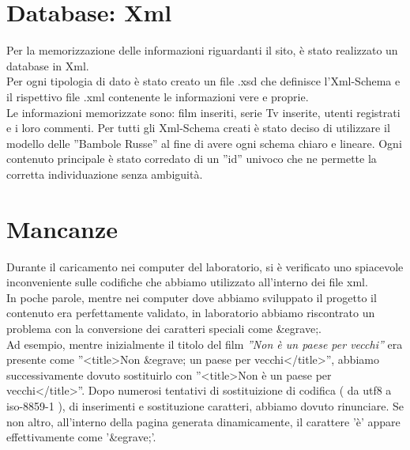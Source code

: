 \section{Database: Xml}
Per la memorizzazione delle informazioni riguardanti il sito, è stato realizzato un database in Xml.\\
Per ogni tipologia di dato è stato creato un file .xsd che definisce l'Xml-Schema e il rispettivo file .xml contenente le informazioni vere e proprie.\\
Le informazioni memorizzate sono: film inseriti, serie Tv inserite, utenti registrati e i loro commenti.
Per tutti gli Xml-Schema creati è stato deciso di utilizzare il modello delle ''Bambole Russe'' al fine di avere ogni schema chiaro e lineare.
Ogni contenuto principale è stato corredato di un ''id'' univoco che ne permette la corretta individuazione senza ambiguità.










\section{Mancanze}
Durante il caricamento nei computer del laboratorio, si è verificato uno spiacevole inconveniente sulle codifiche che abbiamo utilizzato all'interno dei file xml.\\
In poche parole, mentre nei computer dove abbiamo sviluppato il progetto il contenuto era perfettamente validato, in laboratorio abbiamo riscontrato un problema con la conversione dei caratteri speciali come \&egrave;.\\
Ad esempio, mentre inizialmente il titolo del film \textit{''Non è un paese per vecchi''} era presente come ''<title>Non \&egrave; un paese per vecchi</title>'', abbiamo successivamente dovuto sostituirlo con ''<title>Non è un paese per vecchi</title>''. Dopo numerosi tentativi di sostituizione di codifica ( da utf8 a iso-8859-1 ), di inserimenti e sostituzione caratteri, abbiamo dovuto rinunciare. Se non altro, all'interno della pagina generata dinamicamente, il carattere 'è' appare effettivamente come '\&egrave;'.

 


